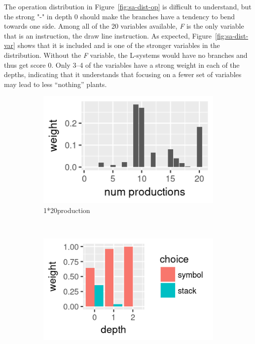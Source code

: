 The operation distribution in Figure~\ref{fig:sa-dist-op} is difficult to understand, but the strong "-" in depth 0 should make the branches have a tendency to bend towards one side.
Among all of the 20 variables available, \textit{F} is the only variable that is an instruction, the draw line instruction.
As expected, Figure~\ref{fig:sa-dist-var} shows that it is included and is one of the stronger variables in the distribution.
Without the \textit{F} variable, the L-systems would have no branches and thus get score 0.
Only 3--4 of the variables have a strong weight in each of the depths, indicating that it understands that focusing on a fewer set of variables may lead to less ``nothing'' plants.

\begin{figure}
    \centering
    \begin{subfigure}{0.48\textwidth}
        \includegraphics[width=\textwidth]{figures/sa-dist-prod}
        \caption{1*20production}
        \label{fig:sa-dist-prod}
    \end{subfigure}
    ~
    \begin{subfigure}{0.48\textwidth}
        \includegraphics[width=\textwidth]{figures/sa-dist-stack}

\end{subfigure}
\end{figure}
